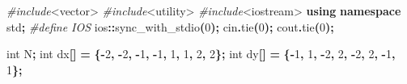 \documentclass[
]{article}
\newenvironment{Shaded}{\begin{snugshade}}{\end{snugshade}}
\newcommand{\DataTypeTok}[1]{\textcolor[rgb]{0.13,0.29,0.53}{#1}}
\newcommand{\DecValTok}[1]{\textcolor[rgb]{0.00,0.00,0.81}{#1}}
\newcommand{\ImportTok}[1]{#1}
\newcommand{\KeywordTok}[1]{\textcolor[rgb]{0.13,0.29,0.53}{\textbf{#1}}}
\newcommand{\NormalTok}[1]{#1}
\newcommand{\OperatorTok}[1]{\textcolor[rgb]{0.81,0.36,0.00}{\textbf{#1}}}
\newcommand{\PreprocessorTok}[1]{\textcolor[rgb]{0.56,0.35,0.01}{\textit{#1}}}
\begin{document}
\begin{Shaded}
\begin{Highlighting}[]
\PreprocessorTok{\#include}\ImportTok{\textless{}vector\textgreater{}}
\PreprocessorTok{\#include}\ImportTok{\textless{}utility\textgreater{}}
\PreprocessorTok{\#include}\ImportTok{\textless{}iostream\textgreater{}}
\KeywordTok{using} \KeywordTok{namespace}\NormalTok{ std}\OperatorTok{;}
\PreprocessorTok{\#define IOS }\NormalTok{ios}\OperatorTok{::}\NormalTok{sync\_with\_stdio}\OperatorTok{(}\DecValTok{0}\OperatorTok{);}\PreprocessorTok{ }\NormalTok{cin}\OperatorTok{.}\NormalTok{tie}\OperatorTok{(}\DecValTok{0}\OperatorTok{);}\PreprocessorTok{ }\NormalTok{cout}\OperatorTok{.}\NormalTok{tie}\OperatorTok{(}\DecValTok{0}\OperatorTok{);}

\DataTypeTok{int}\NormalTok{ N}\OperatorTok{;}
\DataTypeTok{int}\NormalTok{ dx}\OperatorTok{[]} \OperatorTok{=} \OperatorTok{\{{-}}\DecValTok{2}\OperatorTok{,} \OperatorTok{{-}}\DecValTok{2}\OperatorTok{,} \OperatorTok{{-}}\DecValTok{1}\OperatorTok{,} \OperatorTok{{-}}\DecValTok{1}\OperatorTok{,} \DecValTok{1}\OperatorTok{,} \DecValTok{1}\OperatorTok{,} \DecValTok{2}\OperatorTok{,} \DecValTok{2}\OperatorTok{\};}
\DataTypeTok{int}\NormalTok{ dy}\OperatorTok{[]} \OperatorTok{=} \OperatorTok{\{{-}}\DecValTok{1}\OperatorTok{,} \DecValTok{1}\OperatorTok{,} \OperatorTok{{-}}\DecValTok{2}\OperatorTok{,} \DecValTok{2}\OperatorTok{,} \OperatorTok{{-}}\DecValTok{2}\OperatorTok{,} \DecValTok{2}\OperatorTok{,} \OperatorTok{{-}}\DecValTok{1}\OperatorTok{,} \DecValTok{1}\OperatorTok{\};}


\end{Highlighting}
\end{Shaded}
\end{document}
